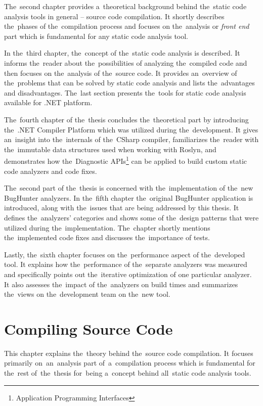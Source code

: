 \documentclass[
  digital, %
  table,   %
  lof,     %
  lot,     %
  oneside,
]{fithesis3}
\begin{document}
The~second chapter provides a~theoretical background behind the~static code analysis tools in general -- source code compilation. It shortly describes the~phases of the~compilation process and focuses on the~analysis or \textit{front end} part which is fundamental for any static code analysis tool.

In the~third chapter, the~concept of the~static code analysis is described. It informs the~reader about the~possibilities of analyzing the~compiled code and then focuses on the~analysis of the~source code. It provides an~overview of the~problems that can be solved by static code analysis and lists the~advantages and disadvantages. The~last section presents the~tools for static code analysis available for .NET platform.

The~fourth chapter of the~thesis concludes the~theoretical part by introducing the~.NET Compiler Platform which was utilized during the~development. It gives an~insight into the~internals of the~CSharp compiler, familiarizes the~reader with the~immutable data structures used when working with Roslyn, and demonstrates how the~Diagnostic APIs\footnote{Application Programming Interfaces} can be applied to build custom static code analyzers and code fixes.

The~second part of the~thesis is concerned with the~implementation of the~new BugHunter analyzers. In the~fifth chapter the~original BugHunter application is introduced, along with the~issues that are being addressed by this thesis. It defines the~analyzers' categories and shows some of the~design patterns that were utilized during the~implementation. The~chapter shortly mentions the~implemented code fixes and discusses the~importance of tests.

Lastly, the~sixth chapter focuses on the~performance aspect of the~developed tool. It explains how the~performance of the~separate analyzers was measured and specifically points out the~iterative optimization of one particular analyzer. It also assesses the~impact of the~analyzers on build times and summarizes the~views on the~development team on the~new tool.


\chapter{Compiling Source Code}
\label{chap:compilers}
This chapter explains the~theory behind the~source code compilation. It focuses primarily on~an~analysis part of~a~compilation process which is fundamental for the~rest of~the~thesis for~being a~concept behind all~static code analysis tools.
\end{document}
